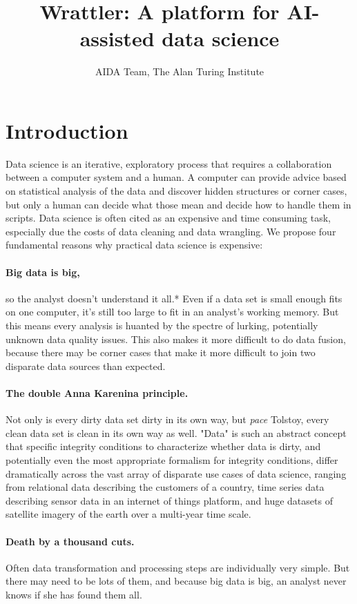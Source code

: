 \documentclass[sigplan,preprint,10pt]{acmart}\settopmatter{printfolios=true,printccs=false,printacmref=false}
\title{Wrattler: \textnormal{A platform for AI-assisted data science}}
\author{AIDA Team, The Alan Turing Institute}
\begin{document}
\maketitle

\section{Introduction}
Data science is an iterative, exploratory process that requires a collaboration between a
computer system and a human. A computer can provide advice based on statistical analysis of the
data and discover hidden structures or corner cases, but only a human can decide what those mean
and decide how to handle them in scripts. Data science is often cited as an expensive
and time consuming task, especially due the costs of data cleaning and data wrangling.
We propose four fundamental reasons why
practical data science is expensive:

\paragraph{Big data is big,}
so the analyst doesn't understand it all.*
Even if a data set is small enough fits on one computer, it's still too large to fit in
an analyst's working memory.
But this means every analysis is huanted
by the spectre of lurking, potentially
unknown data quality  issues.
This also makes it more difficult to do data fusion, because there may be corner cases that make it more difficult to join two disparate data sources than expected.

\paragraph{The double Anna Karenina principle.}
Not only is every dirty data set  dirty in its own way, but \emph{pace} Tolstoy, every clean data set is clean in its own way as well.
"Data" is such an abstract concept that specific integrity conditions to characterize whether data is dirty, and potentially even the most appropriate formalism for integrity conditions,  differ dramatically across
the vast array of disparate use cases of data science,
ranging from relational data describing the customers of a country, time series data describing sensor data in an internet of things platform, and huge datasets of satellite imagery of the earth over a multi-year time scale.

\paragraph{Death by a thousand cuts.}
Often data transformation and processing steps are individually  very simple. But  there may need to be lots of them, and
because big data is big,
an analyst never knows if she has found them all.
\end{document}
